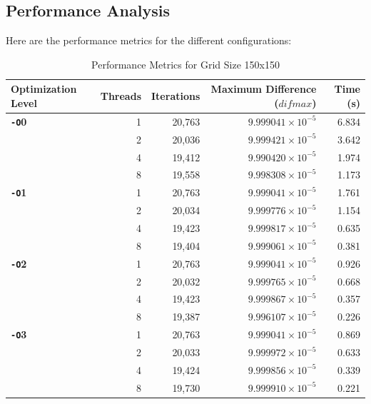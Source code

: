 \documentclass{article}
\begin{document}
\subsection{Performance Analysis}

Here are the performance metrics for the different configurations:

\begin{table}[H]
    \centering
    \caption{Performance Metrics for Grid Size 150x150}
    \label{tab:performance_150}
    \begin{tabular}{l r r r r}
    \toprule
    \textbf{Optimization Level} & \textbf{Threads} & \textbf{Iterations} & \textbf{Maximum Difference ($difmax$)} & \textbf{Time (s)} \\
    \midrule
    \textbf{\texttt{-O}0} & 1 & 20,763 & $9.999041 \times 10^{-5}$ & 6.834 \\
        & 2 & 20,036 & $9.999421 \times 10^{-5}$ & 3.642 \\
        & 4 & 19,412 & $9.990420 \times 10^{-5}$ & 1.974 \\
        & 8 & 19,558 & $9.998308 \times 10^{-5}$ & 1.173 \\
    \midrule
    \textbf{\texttt{-O}1} & 1 & 20,763 & $9.999041 \times 10^{-5}$ & 1.761 \\
        & 2 & 20,034 & $9.999776 \times 10^{-5}$ & 1.154 \\
        & 4 & 19,423 & $9.999817 \times 10^{-5}$ & 0.635 \\
        & 8 & 19,404 & $9.999061 \times 10^{-5}$ & 0.381 \\
    \midrule
    \textbf{\texttt{-O}2} & 1 & 20,763 & $9.999041 \times 10^{-5}$ & 0.926 \\
        & 2 & 20,032 & $9.999765 \times 10^{-5}$ & 0.668 \\
        & 4 & 19,423 & $9.999867 \times 10^{-5}$ & 0.357 \\
        & 8 & 19,387 & $9.996107 \times 10^{-5}$ & 0.226 \\
    \midrule
    \textbf{\texttt{-O}3} & 1 & 20,763 & $9.999041 \times 10^{-5}$ & 0.869 \\
        & 2 & 20,033 & $9.999972 \times 10^{-5}$ & 0.633 \\
        & 4 & 19,424 & $9.999856 \times 10^{-5}$ & 0.339 \\
        & 8 & 19,730 & $9.999910 \times 10^{-5}$ & 0.221 \\
    \bottomrule
    \end{tabular}
\end{table}
\end{document}
